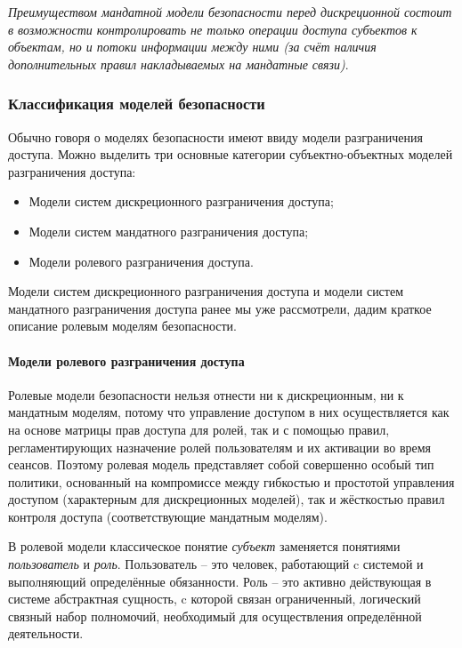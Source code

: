 \textit{Преимуществом мандатной модели безопасности перед дискреционной состоит в возможности 
контролировать не только операции доступа субъектов к объектам, но и потоки информации между 
ними (за счёт наличия дополнительных правил накладываемых на мандатные связи)}.

\subsubsection{Классификация моделей безопасности}

Обычно говоря о моделях безопасности имеют ввиду модели разграничения доступа. Можно выделить три 
основные категории субъектно-объектных моделей разграничения доступа:
\begin{itemize}
    \item Модели систем дискреционного разграничения доступа;
    \item Модели систем мандатного разграничения доступа;
    \item Модели ролевого разграничения доступа.
\end{itemize}

Модели систем дискреционного разграничения доступа и модели систем мандатного разграничения доступа 
ранее мы уже рассмотрели, дадим краткое описание ролевым моделям безопасности.

\paragraph{Модели ролевого разграничения доступа}

Ролевые модели безопасности нельзя отнести ни к дискреционным, ни к мандатным моделям, потому что 
управление доступом в них осуществляется как на основе матрицы прав доступа для ролей, так и с помощью 
правил, регламентирующих назначение ролей пользователям и их активации во время сеансов. Поэтому 
ролевая модель представляет собой совершенно особый тип политики, основанный на компромиссе между 
гибкостью и простотой управления доступом (характерным для дискреционных моделей), так и жёсткостью 
правил контроля доступа (соответствующие мандатным моделям).

В ролевой модели классическое понятие \textit{субъект} заменяется понятиями \textit{пользователь} и 
\textit{роль}. Пользователь -- это человек, работающий c системой и выполняющий определённые 
обязанности. Роль -- это активно действующая в системе абстрактная сущность, c которой связан 
ограниченный, логический связный набор полномочий, необходимый для осуществления определённой деятельности.

